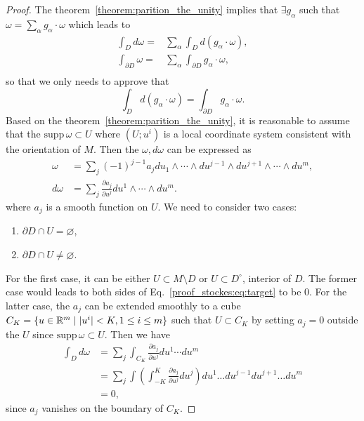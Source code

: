 \begin{proof}
The theorem~\ref{theorem:parition_the_unity} implies that $\exists g_\alpha$ such that $\omega=\sum_\alpha g_\alpha\cdot \omega$ which leads to
\begin{equation*}
\begin{aligned}
\int_Dd\omega=&\sum_\alpha\int_Dd(g_\alpha\cdot\omega),\\
\int_{\partial D}\omega=&\sum_\alpha\int_{\partial D}g_\alpha\cdot\omega,\\
\end{aligned}
\end{equation*}
so that we only needs to approve that
\begin{equation}
\int_Dd(g_\alpha\cdot\omega)=\int_{\partial D}g_\alpha\cdot\omega.
\end{equation}\label{proof_stockes:eq:target}
Based on the theorem~\ref{theorem:parition_the_unity}, it is reasonable to assume that the $\text{supp}\,\omega\subset U$ where $(U;u^i)$ is a local coordinate system consistent with the orientation of $M$. Then the $\omega,d\omega$ can be expressed as
\begin{equation*}
\begin{aligned}
\omega&=\sum_j(-1)^{j-1}a_jdu_1\wedge\cdots\wedge du^{j-1}\wedge du^{j+1}\wedge\cdots\wedge du^m,\\
d\omega&=\sum_j\frac{\partial a_j}{\partial u^j}du^1\wedge\cdots\wedge du^m.
\end{aligned}
\end{equation*}
where $a_j$ is a smooth function on $U$. We need to consider two cases:
\begin{enumerate}
\item $\partial D\cap U=\varnothing$,
\item $\partial D\cap U\ne\varnothing$.
\end{enumerate}
For the first case, it can be either $U\subset M\setminus D$ or $U\subset D^\circ$, interior of $D$. The former case would leads to both sides of Eq.~\ref{proof_stockes:eq:target} to be 0. For the latter case, the $a_j$ can be extended smoothly to a cube $C_K=\{u\in\mathbb{R}^m\mid|u^i|<K,1\le i\le m\}$ such that $U\subset C_K$ by setting $a_j=0$ outside the $U$ since $\text{supp}\,\omega\subset U$. Then we have
\begin{equation*}
\begin{aligned}
\int_Dd\omega&=\sum_j\int_{C_K}\frac{\partial a_j}{\partial u^j}du^1\cdots du^m\\
&=\sum_j\int\left(\int_{-K}^K\frac{\partial a_j}{\partial u^j}du^j\right)du^1\dots du^{j-1}du^{j+1}\dots du^m\\
&=0,
\end{aligned}
\end{equation*}
since $a_j$ vanishes on the boundary of $C_K$.


\end{proof}
